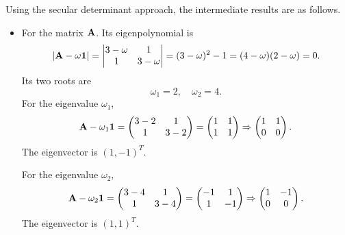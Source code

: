 \documentclass[a4paper]{book}
\newcounter{solution}[chapter]
\newcommand{\A}{{\bf A}}
\newcommand{\I}{{\bf 1}}
\begin{document}
	\begin{solution}
	
	Using the secular determinant approach, the intermediate results are as follows.
	
	\begin{itemize}
	
	\item For the matrix $\A$. Its eigenpolynomial is
	\begin{align*}
		| \A - \omega \I | = \begin{vmatrix}
			3 - \omega & 1 \\ 1 & 3 - \omega 
		\end{vmatrix} = ( 3 - \omega )^2 - 1 = ( 4 - \omega ) ( 2 - \omega ) = 0.
	\end{align*}
	Its two roots are
	\[
		\omega_1 = 2 , \quad \omega_2 = 4.
	\]
	For the eigenvalue $\omega_1$,
	\[
		\A - \omega_1 \I = \begin{pmatrix}
			3 - 2 & 1 \\ 1 & 3 - 2
		\end{pmatrix} = \begin{pmatrix}
			1 & 1 \\ 1 & 1
		\end{pmatrix} \Rightarrow \begin{pmatrix}
			1 & 1 \\ 0 & 0
		\end{pmatrix} .
	\]
	The eigenvector is $(1,-1)^T$.
	
	For the eigenvalue $\omega_2$,
	\[
		\A - \omega_2 \I = \begin{pmatrix}
			3 - 4 & 1 \\ 1 & 3 - 4
		\end{pmatrix} = \begin{pmatrix}
			-1 & 1 \\ 1 & -1
		\end{pmatrix} \Rightarrow \begin{pmatrix}
			1 & -1 \\ 0 & 0
		\end{pmatrix} .
	\]
	The eigenvector is $(1,1)^T$.
	

\end{itemize}
\end{solution}
\end{document}

